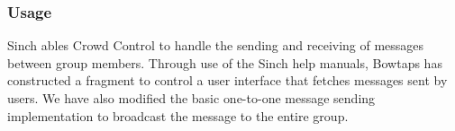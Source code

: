 	\subsubsection{Usage}
	Sinch ables Crowd Control to handle the sending and receiving of messages between group members. Through use of the Sinch help manuals, Bowtaps has constructed a fragment to control a user interface that fetches messages sent by users. We have also modified the basic one-to-one message sending implementation to broadcast the message to the entire group.



